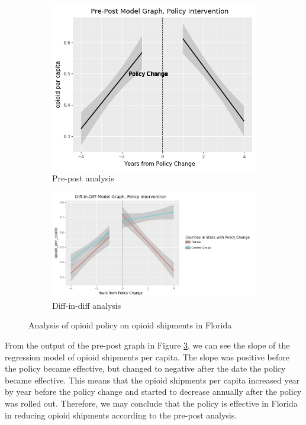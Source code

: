 \documentclass[12pt,letterpaper]{article}
\begin{document}
\begin{figure}[!h]
\centering
\begin{subfigure}{.5\textwidth}
  \centering
  \includegraphics[width=.7\linewidth]{../30_results/General_Results/florida_opioid_shipment_prepost.png}
  \caption{Pre-post analysis}
  \label{fig:fl_ship_prepost}
\end{subfigure}%
\begin{subfigure}{.5\textwidth}
  \centering
  \includegraphics[width=1\linewidth]{../30_results/General_Results/florida_opioid_shipment_diffdiff.png}
  \caption{Diff-in-diff analysis}
  \label{fig:fl_ship_did}
\end{subfigure}
\caption{Analysis of opioid policy on opioid shipments in Florida}
\label{fig:fl_ship}
\end{figure}

From the output of the pre-post graph in Figure \ref{fig:fl_ship}, we can see the slope of the regression model of opioid shipments per capita. The slope was positive before the policy became effective, but changed to negative after the date the policy became effective. This means that the opioid shipments per capita increased year by year before the policy change and started to decrease annually after the policy was rolled out. Therefore, we may conclude that the policy is effective in Florida in reducing opioid shipments according to the pre-post analysis.
\end{document}
